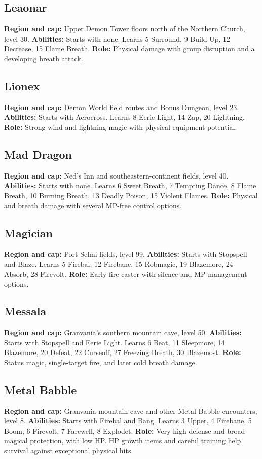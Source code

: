 \subsection{Leaonar}
\textbf{Region and cap:} Upper Demon Tower floors north of the Northern Church, level 30.
\textbf{Abilities:} Starts with none. Learns 5 Surround, 9 Build Up,
12 Decrease, 15 Flame Breath.
\textbf{Role:} Physical damage with group disruption and a developing breath attack.

\subsection{Lionex}
\textbf{Region and cap:} Demon World field routes and Bonus Dungeon, level 23.
\textbf{Abilities:} Starts with Aerocross. Learns 8 Eerie Light,
14 Zap, 20 Lightning.
\textbf{Role:} Strong wind and lightning magic with physical equipment potential.

\subsection{Mad Dragon}
\textbf{Region and cap:} Ned's Inn and southeastern-continent fields, level 40.
\textbf{Abilities:} Starts with none. Learns 6 Sweet Breath, 7 Tempting Dance,
8 Flame Breath, 10 Burning Breath, 13 Deadly Poison, 15 Violent Flames.
\textbf{Role:} Physical and breath damage with several MP-free control options.

\subsection{Magician}
\textbf{Region and cap:} Port Selmi fields, level 99.
\textbf{Abilities:} Starts with Stopspell and Blaze. Learns 5 Firebal,
12 Firebane, 15 Robmagic, 19 Blazemore, 24 Absorb, 28 Firevolt.
\textbf{Role:} Early fire caster with silence and MP-management options.

\subsection{Messala}
\textbf{Region and cap:} Granvania's southern mountain cave, level 50.
\textbf{Abilities:} Starts with Stopspell and Eerie Light. Learns 6 Beat,
11 Sleepmore, 14 Blazemore, 20 Defeat, 22 Curseoff, 27 Freezing Breath,
30 Blazemost.
\textbf{Role:} Status magic, single-target fire, and later cold breath damage.

\subsection{Metal Babble}
\textbf{Region and cap:} Granvania mountain cave and other Metal Babble encounters, level 8.
\textbf{Abilities:} Starts with Firebal and Bang. Learns 3 Upper, 4 Firebane,
5 Boom, 6 Firevolt, 7 Farewell, 8 Explodet.
\textbf{Role:} Very high defense and broad magical protection, with low HP.
HP growth items and careful training help survival against exceptional physical hits.

